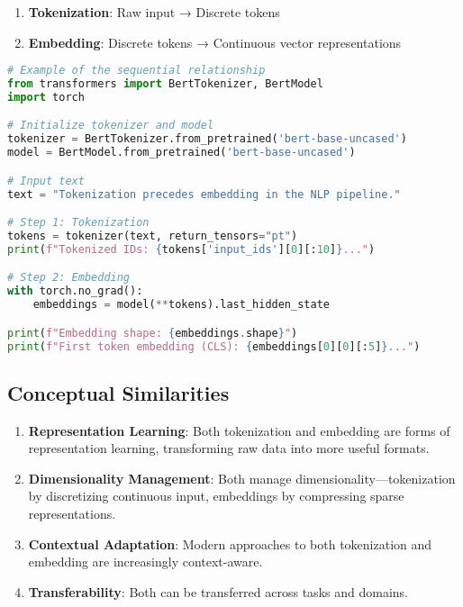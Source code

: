 \documentclass{article}
\begin{document}
\begin{enumerate}
\item \textbf{Tokenization}: Raw input → Discrete tokens
\item \textbf{Embedding}: Discrete tokens → Continuous vector representations
\end{enumerate}

\begin{lstlisting}[language=Python]
# Example of the sequential relationship
from transformers import BertTokenizer, BertModel
import torch

# Initialize tokenizer and model
tokenizer = BertTokenizer.from_pretrained('bert-base-uncased')
model = BertModel.from_pretrained('bert-base-uncased')

# Input text
text = "Tokenization precedes embedding in the NLP pipeline."

# Step 1: Tokenization
tokens = tokenizer(text, return_tensors="pt")
print(f"Tokenized IDs: {tokens['input_ids'][0][:10]}...")

# Step 2: Embedding
with torch.no_grad():
    embeddings = model(**tokens).last_hidden_state

print(f"Embedding shape: {embeddings.shape}")
print(f"First token embedding (CLS): {embeddings[0][0][:5]}...")
\end{lstlisting}

\subsection{Conceptual Similarities}
\begin{enumerate}
\item \textbf{Representation Learning}: Both tokenization and embedding are forms of representation learning, transforming raw data into more useful formats.

\item \textbf{Dimensionality Management}: Both manage dimensionality—tokenization by discretizing continuous input, embeddings by compressing sparse representations.

\item \textbf{Contextual Adaptation}: Modern approaches to both tokenization and embedding are increasingly context-aware.

\item \textbf{Transferability}: Both can be transferred across tasks and domains.
\end{enumerate}
\end{document}
